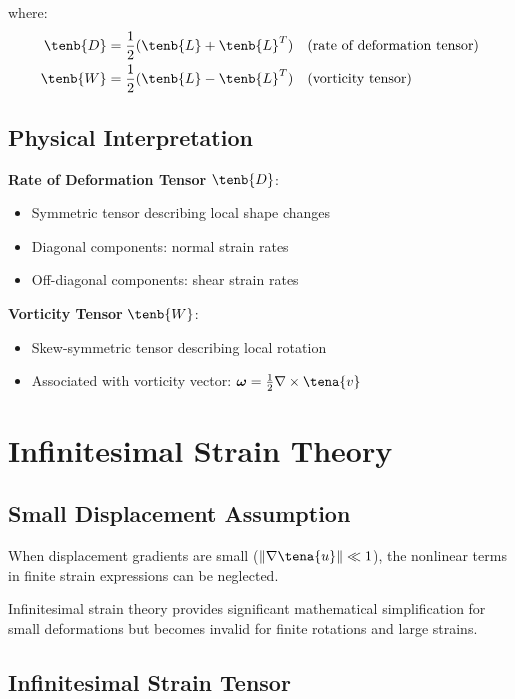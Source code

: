 where:
\begin{align}
\tenb{D} &= \frac{1}{2}(\tenb{L} + \tenb{L}^T) \quad \text{(rate of deformation tensor)} \\
\tenb{W} &= \frac{1}{2}(\tenb{L} - \tenb{L}^T) \quad \text{(vorticity tensor)}
\end{align}

\subsection{Physical Interpretation}

\textbf{Rate of Deformation Tensor} $\tenb{D}$:
\begin{itemize}
\item Symmetric tensor describing local shape changes
\item Diagonal components: normal strain rates
\item Off-diagonal components: shear strain rates
\end{itemize}

\textbf{Vorticity Tensor} $\tenb{W}$:
\begin{itemize}
\item Skew-symmetric tensor describing local rotation
\item Associated with vorticity vector: $\boldsymbol{\omega} = \frac{1}{2}\nabla \times \tena{v}$
\end{itemize}

\section{Infinitesimal Strain Theory}

\subsection{Small Displacement Assumption}

When displacement gradients are small ($\|\nabla \tena{u}\| \ll 1$), the nonlinear terms in finite strain expressions can be neglected.

\begin{keypoint}
Infinitesimal strain theory provides significant mathematical simplification for small deformations but becomes invalid for finite rotations and large strains.
\end{keypoint}

\subsection{Infinitesimal Strain Tensor}

